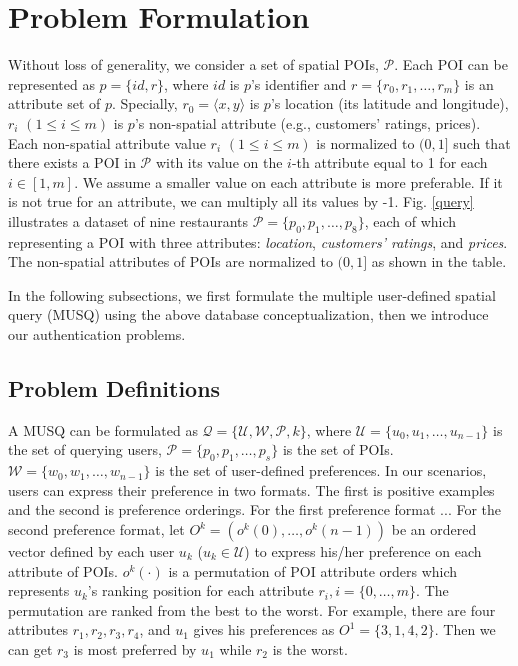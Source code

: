 \documentclass[10pt, conference, compsocconf]{IEEEtran}
\begin{document}
\section{Problem Formulation}\label{problem_formulation}

Without loss of generality, we consider a set of spatial POIs, $\mathcal{P}$. Each POI can be represented as $p=\{id, r\}$, where $id$ is $p$'s identifier and $r = \{r_0,r_1,\ldots,r_m\}$ is an attribute set of $p$. Specially, $r_0 = \langle x,y \rangle$ is $p$'s location (its latitude and longitude), $r_i$ $(1\leq i \leq m)$ is $p$'s non-spatial attribute (e.g., customers' ratings, prices). Each non-spatial attribute value $r_i$ $(1\leq i \leq m)$ is normalized to $(0,1]$ such that there exists a POI in $\mathcal{P}$ with its value on the $i$-th attribute equal to 1 for each $i \in [1,m]$. We assume a smaller value on each attribute is more preferable. If it is not true for an attribute, we can multiply all its values by -1. Fig. \ref{query} illustrates a dataset of nine restaurants $\mathcal{P}= \{p_0 ,p_1,\ldots,p_8\}$,  each of which representing a POI with three attributes: \emph{location}, \textit{customers' ratings}, and \textit{prices}. The non-spatial attributes of POIs are normalized to $(0,1]$ as shown in the table.

In the following subsections, we first formulate the multiple user-defined spatial query (MUSQ) using the above database conceptualization, then we introduce our authentication problems.


\subsection{Problem Definitions}

A MUSQ can be formulated as $\mathcal{Q}=\{\mathcal{U},\mathcal{W},\mathcal{P},k\}$, where $\mathcal{U}=\{u_0,u_1,\ldots,u_{n-1}\}$ is the set of querying users, $\mathcal{P}=\{p_0,p_1,\ldots,p_s\}$ is the set of POIs. $\mathcal{W}=\{w_0,w_1,\ldots,w_{n-1}\}$ is the set of user-defined preferences. In our scenarios, users can express their preference in two formats. The first is positive examples and the second is preference orderings. For the first preference format ...
For the second preference format, let $O^k = (o^k(0),\ldots,o^k(n-1))$ be an ordered vector defined by each user $u_k$ ($u_k \in \mathcal{U}$) to express his/her preference on each attribute of POIs. $o^k(\cdot)$ is a permutation of POI attribute orders which represents $u_k$'s ranking position for each attribute $r_i, i = \{0,\ldots,m\}$. The permutation are ranked from the best to the worst. For example, there are four attributes $r_1,r_2,r_3,r_4$, and $u_1$ gives his preferences as $O^1 = \{3,1,4,2\}$. Then we can get $r_3$ is most preferred by $u_1$ while $r_2$ is the worst.
\end{document}
